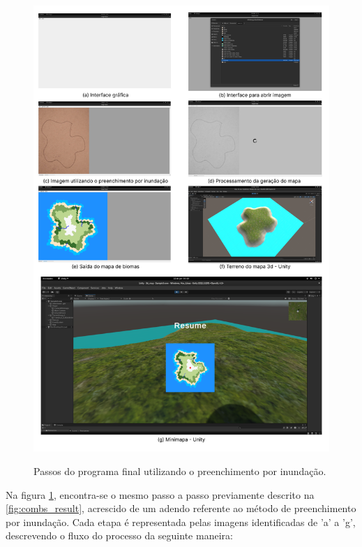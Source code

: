 \begin{figure}[!ht]
	\centering
    \caption{Passos do programa final utilizando o preenchimento por inundação.}
	\includegraphics[width=\textwidth]{figures/geracao_balde_tinta.png}
	\label{fig:combs_result_2}
\end{figure}

\pagebreak

Na figura \cref{fig:combs_result_2}, encontra-se o mesmo passo a passo previamente descrito na \cref{fig:combs_result}, acrescido de um adendo referente ao método de preenchimento por inundação. Cada etapa é representada pelas imagens identificadas de 'a' a 'g', descrevendo o fluxo do processo da seguinte maneira:

